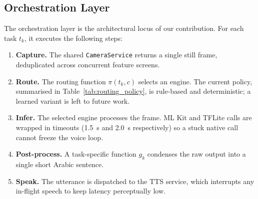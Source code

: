 \documentclass[11pt,a4paper]{article}
\begin{document}
\subsection{Orchestration Layer}

The orchestration layer is the architectural locus of our contribution.
For each task $t_k$, it executes the following steps:

\begin{enumerate}
\item \textbf{Capture.} The shared \texttt{CameraService} returns a
single still frame, deduplicated across concurrent feature screens.
\item \textbf{Route.} The routing function $\pi(t_k, c)$ selects an
engine. The current policy, summarised in
Table~\ref{tab:routing_policy}, is rule-based and deterministic; a
learned variant is left to future work.
\item \textbf{Infer.} The selected engine processes the frame. ML Kit and
TFLite calls are wrapped in timeouts (1.5~s and 2.0~s respectively)
so a stuck native call cannot freeze the voice loop.
\item \textbf{Post-process.} A task-specific function $g_k$ condenses the
raw output into a single short Arabic sentence.
\item \textbf{Speak.} The utterance is dispatched to the TTS service,
which interrupts any in-flight speech to keep latency perceptually
low.
\end{enumerate}
\end{document}
